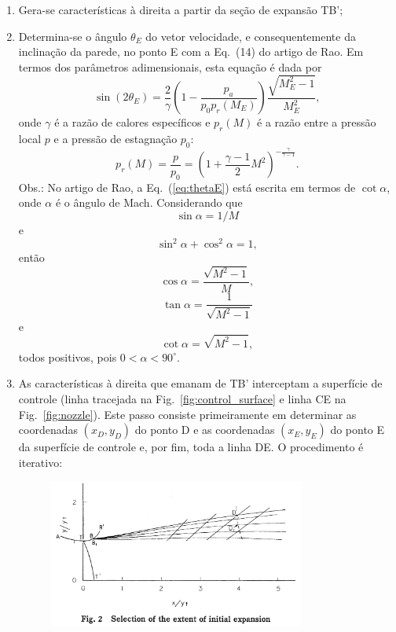 \documentclass[12pt,a4paper]{article}
\begin{document}
\begin{enumerate}
	\item Gera-se características à direita a partir da seção de expansão TB'; 
	\item Determina-se o ângulo $\theta_E$ do vetor velocidade, e consequentemente da inclinação da parede, no ponto E com a Eq.~(14) do artigo de Rao. Em termos dos parâmetros adimensionais, esta equação é dada por
	\begin{equation}\label{eq:thetaE}
	\sin{(2\theta_E)}=\frac{2}{\gamma}\left(1-\frac{p_a}{p_0p_r(M_E)}\right)\frac{\sqrt{M_E^2-1}}{M_E^2},
	\end{equation}
	onde $\gamma$ é a razão de calores específicos e $p_r(M)$ é a razão entre a pressão local $p$ e a pressão de estagnação $p_0$:
	\begin{equation}\label{eq:pr}
	p_r(M)=\frac{p}{p_0}=\left(1+\frac{\gamma-1}{2}M^2\right)^{-\frac{\gamma}{\gamma-1}}.
	\end{equation}
	Obs.: No artigo de Rao, a Eq.~(\ref{eq:thetaE}) está escrita em termos de $\cot{\alpha}$, onde $\alpha$ é o ângulo de Mach. Considerando que 
	\begin{equation}\label{eq:sin_alpha}
	\sin{\alpha}=1/M
	\end{equation} 
	e
	\begin{equation}\label{eq:trig}
	\sin^2{\alpha}+\cos^2{\alpha}=1,
	\end{equation}
	então
	\begin{equation}\label{eq:cos_alpha}
	\cos{\alpha}=\frac{\sqrt{M^2-1}}{M},
	\end{equation} 
	\begin{equation}\label{eq:tan_alpha}
	\tan{\alpha}=\frac{1}{\sqrt{M^2-1}}
	\end{equation}
	e 
	\begin{equation}\label{eq:cot_alpha}
	\cot{\alpha}=\sqrt{M^2-1},
	\end{equation} 
	todos positivos, pois $0 < \alpha < 90^\circ$.
	\item As características à direita que emanam de TB' interceptam a superfície de controle (linha tracejada na Fig.~\ref{fig:control_surface} e linha CE na Fig.~\ref{fig:nozzle}). Este passo consiste primeiramente em determinar as coordenadas $(x_D,y_D)$ do ponto D e as coordenadas $(x_E,y_E)$ do ponto E da superfície de controle e, por fim, toda a linha DE. O procedimento é iterativo:
	\begin{figure}[!ht]
		\centering
		\includegraphics[width=0.8\textwidth]{./fig/control_surface}

\end{figure}
\end{enumerate}
\end{document}
